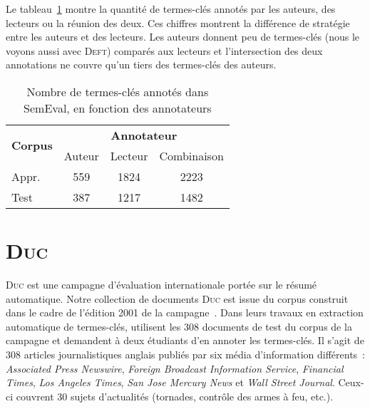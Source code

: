     Le tableau~\ref{tab:semeval_annotators} montre la quantité de termes-clés
    annotés par les auteurs, des lecteurs ou la réunion des deux. Ces chiffres
    montrent la différence de stratégie entre les auteurs et des lecteurs. Les
    auteurs donnent peu de termes-clés (nous le voyons aussi avec \textsc{Deft})
    comparés aux lecteurs et l'intersection des deux annotations ne couvre qu'un
    tiers des termes-clés des auteurs.

    \begin{table}[!h]
      \centering
      \begin{tabular}{l|ccc}
        \toprule
        \multirow{2}{*}{\textbf{Corpus}} & \multicolumn{3}{c}{\textbf{Annotateur}}\\
        \cline{2-4}
        & Auteur & Lecteur & Combinaison\\
        \hline
        \hfill{}Appr. & 559 & 1824 & 2223\\
        \hfill{}Test & 387 & 1217 & 1482\\
        \bottomrule
      \end{tabular}

      \caption{Nombre de termes-clés annotés dans SemEval, en fonction des
               annotateurs
               \label{tab:semeval_annotators}}
    \end{table}


  \section[\textsc{Duc}]{\textsc{Duc}~\textnormal{\large\cite{wan2008expandrank}}}
  \label{sec:main-data_description-duc_data}
    \textsc{Duc} est une campagne d'évaluation internationale portée sur le
    résumé automatique. Notre collection de documents \textsc{Duc} est issue du
    corpus construit dans le cadre de l'édition 2001 de la
    campagne~\cite{over2001duc}. Dans leurs travaux en extraction automatique de
    termes-clés,  utilisent les 308 documents de test
    du corpus de la campagne et demandent à deux étudiants d'en annoter les
    termes-clés. Il s'agit de 308 articles journalistiques  anglais publiés par
    six média d'information différents~: \textit{Associated Press Newswire},
    \textit{Foreign Broadcast Information Service}, \textit{Financial Times},
    \textit{Los Angeles Times}, \textit{San Jose Mercury News} et \textit{Wall
    Street Journal}. Ceux-ci couvrent 30 sujets d'actualités (tornades, contrôle
    des armes à feu, etc.).
    
